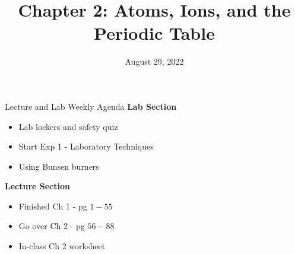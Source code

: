 \documentclass[11pt]{beamer}
\title{Chapter 2: Atoms, Ions, and the Periodic Table}
\institute{Chemistry Department, Cypress College}
\date{August 29, 2022}
\begin{document}
\begin{frame}
  \titlepage
\end{frame}

\begin{frame}{Lecture and Lab Weekly Agenda}
  \textbf{Lab Section}

  \begin{itemize}
  \item Lab lockers and safety quiz
  \item Start Exp 1 - Laboratory Techniques
  \item Using Bunsen burners
  \end{itemize}

  \textbf{Lecture Section}

  \begin{itemize}
  \item Finished Ch 1 - pg $1 - 55$
  \item Go over Ch 2 - pg $56 - 88$
  \item In-class Ch 2 worksheet
  \end{itemize}
\end{frame}
\end{document}
